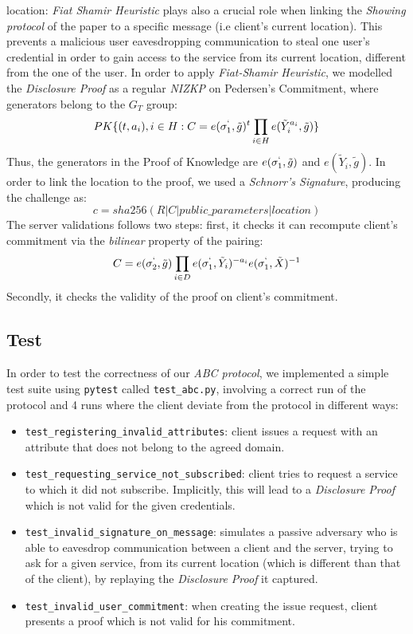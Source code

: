 \documentclass[10pt,conference,compsocconf]{IEEEtran}
\begin{document}
\begin{itemize}
{    location}: \textit{Fiat Shamir Heuristic} plays also a crucial role when
    linking the \textit{Showing protocol} of the paper to a specific message
    (i.e client's current location). This prevents a malicious user
    eavesdropping communication to steal one user's credential in order to gain
    access to the service from its current location, different from the one of the user. In order to apply
    \textit{Fiat-Shamir Heuristic}, we modelled the \textit{Disclosure Proof} as
    a regular \textit{NIZKP} on Pedersen's Commitment, where generators belong
    to the $G_T$ group: \[PK\{(t,a_i), i \in H : C=e(\sigma_{1}^{`},
    \tilde{g})^t\prod_{i \in H}e(\tilde{Y}_{i}^{a_i},\tilde{g})\}\]
    Thus, the generators in the Proof of Knowledge are $e(\sigma_{1}^{`}, \tilde{g})$ and
    $e(\tilde{Y}_{i},\tilde{g})$. In order to link the location to the
    proof, we used a \textit{Schnorr's Signature}, producing the challenge as:
    \[c = sha256(R|C|public\_parameters|location)\]
    The server validations follows two steps: first, it checks it can recompute client's commitment via
    the \textit{bilinear} property of the pairing:
    \[C = e(\sigma_2^`,\tilde{g})\prod_{i \in
    D}e(\sigma_1^`,\tilde{Y}_i)^{-a_i}e(\sigma_1^`,\tilde{X})^{-1}\] Secondly,
    it checks the validity of the proof on client's commitment.
\end{itemize}
\subsection{Test}
In order to test the correctness of our \textit{ABC protocol}, we implemented a
simple test suite using \texttt{pytest} called \texttt{test\_abc.py}, involving
a correct run of the protocol and 4 runs where the client deviate from the
protocol in different ways:
\begin{itemize}
    \item \texttt{test\_registering\_invalid\_attributes}: client issues a
    request with an attribute that does not belong to the agreed domain.
    \item \texttt{test\_requesting\_service\_not\_subscribed}: client tries to
    request a service to which it did not subscribe. Implicitly, this will lead
    to a \textit{Disclosure Proof} which is not valid for the given credentials.
    \item \texttt{test\_invalid\_signature\_on\_message}: simulates a passive
    adversary who is able to eavesdrop communication between a client and
    the server, trying to ask for a given service, from its current location (which is different than that of the client), by
    replaying the \textit{Disclosure Proof} it captured.
    \item \texttt{test\_invalid\_user\_commitment}: when creating the issue
    request, client presents a proof which is not valid for his commitment.
\end{itemize}
\end{document}
